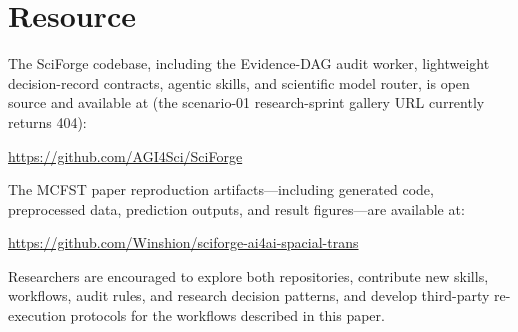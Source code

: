 \documentclass[sn-basic,Numbered,pdflatex]{sn-jnl}
\begin{document}
\section{Resource}

The SciForge codebase, including the Evidence-DAG audit worker, lightweight decision-record contracts, agentic skills, and scientific model router, is open source and available at (the scenario-01 research-sprint gallery URL currently returns 404):

\vspace{4pt}
\centering
\url{https://github.com/AGI4Sci/SciForge}
\vspace{8pt}

\noindent The MCFST paper reproduction artifacts---including generated code, preprocessed data, prediction outputs, and result figures---are available at:

\vspace{4pt}
\centering
\url{https://github.com/Winshion/sciforge-ai4ai-spacial-trans}
\vspace{8pt}

\noindent Researchers are encouraged to explore both repositories, contribute new skills, workflows, audit rules, and research decision patterns, and develop third-party re-execution protocols for the workflows described in this paper.


\end{document}
